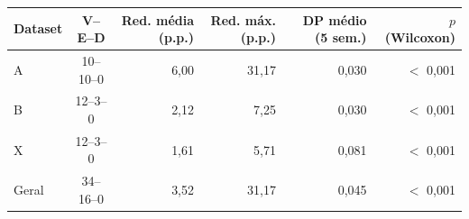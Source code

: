 \small
\begin{tabular}{lcrrrr}
\toprule
Dataset & V--E--D & Red. média (p.p.) & Red. máx. (p.p.) & DP médio (5 sem.) & $p$ (Wilcoxon) \\
\midrule
A & 10--10--0 & 6,00 & 31,17 & 0,030 & $<$ 0,001 \\
B & 12--3--0 & 2,12 & 7,25 & 0,030 & $<$ 0,001 \\
X & 12--3--0 & 1,61 & 5,71 & 0,081 & $<$ 0,001 \\
Geral & 34--16--0 & 3,52 & 31,17 & 0,045 & $<$ 0,001 \\
\bottomrule
\end{tabular}

